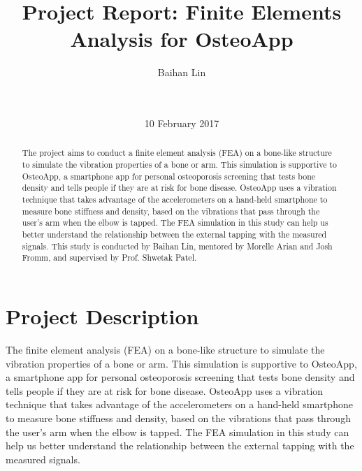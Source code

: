 \documentclass{sig-alternate-ipsn13}
\begin{document}
\title{Project Report: Finite Elements Analysis for OsteoApp}


\author{
  \alignauthor
  Baihan Lin\\
         \\
          \\
}

\date{10 February 2017}

\maketitle


\begin{abstract}
The project aims to conduct a finite element analysis (FEA) on a bone-like structure to simulate the vibration properties of a bone or arm. This simulation is supportive to OsteoApp, a smartphone app for personal osteoporosis screening that tests bone density and tells people if they are at risk for bone disease. OsteoApp uses a vibration technique that takes advantage of the accelerometers on a hand-held smartphone to measure bone stiffness and density, based on the vibrations that pass through the user’s arm when the elbow is tapped. The FEA simulation in this study can help us better understand the relationship between the external tapping with the measured signals. This study is conducted by Baihan Lin, mentored by Morelle Arian and Josh Fromm, and supervised by Prof. Shwetak Patel.
\end{abstract}


\section{Project Description} 

The finite element analysis (FEA) on a bone-like structure to simulate the vibration properties of a bone or arm. This simulation is supportive to OsteoApp, a smartphone app for personal osteoporosis screening that tests bone density and tells people if they are at risk for bone disease. OsteoApp uses a vibration technique that takes advantage of the accelerometers on a hand-held smartphone to measure bone stiffness and density, based on the vibrations that pass through the user’s arm when the elbow is tapped. The FEA simulation in this study can help us better understand the relationship between the external tapping with the measured signals. 
\end{document}
